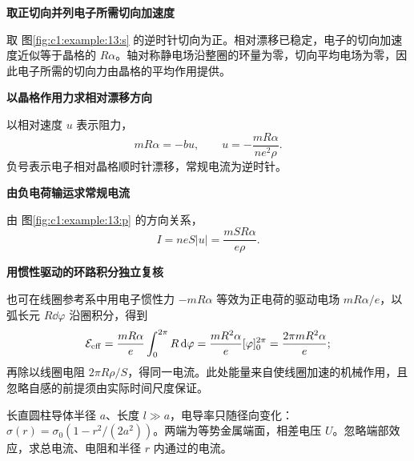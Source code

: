 \begin{solution}\textbf{取正切向并列电子所需切向加速度}\par\nobreak
取 图\ref{fig:c1:example:13:s} 的逆时针切向为正。相对漂移已稳定，电子的切向加速度近似等于晶格的 $R\alpha$。轴对称静电场沿整圈的环量为零，切向平均电场为零，因此电子所需的切向力由晶格的平均作用提供。

\par\medskip{}\noindent\textbf{以晶格作用力求相对漂移方向}\par\nobreak
以相对速度 $u$ 表示阻力，
\[
 mR\alpha=-bu,\qquad u=-\frac{mR\alpha}{ne^2\rho}.
\]
负号表示电子相对晶格顺时针漂移，常规电流为逆时针。



\par\medskip{}\noindent\textbf{由负电荷输运求常规电流}\par\nobreak
由 图\ref{fig:c1:example:13:p} 的方向关系，
\[
 I=neS|u|=\frac{mSR\alpha}{e\rho}.
\]


\par\medskip{}\noindent\textbf{用惯性驱动的环路积分独立复核}\par\nobreak
也可在线圈参考系中用电子惯性力 $-mR\alpha$ 等效为正电荷的驱动电场 $mR\alpha/e$，以弧长元 $R\dd\varphi$ 沿圈积分，得到
\[
 \mathcal E_{\rm eff}=\frac{mR\alpha}{e}\int_0^{2\pi}R\mathop{}\!\mathrm d\varphi
 =\frac{mR^2\alpha}{e}[\varphi]_0^{2\pi}
 =\frac{2\pi mR^2\alpha}{e};
\]再除以线圈电阻 $2\pi R\rho/S$，得同一电流。此处能量来自使线圈加速的机械作用，且忽略自感的前提须由实际时间尺度保证。\end{solution}
\begin{question}\begin{example}[径向不均匀材料的轴向导电]\label{c1:example:14}
长直圆柱导体半径 $a$、长度 $l\gg a$，电导率只随径向变化：$\sigma(r)=\sigma_0(1-r^2/(2a^2))$。两端为等势金属端面，相差电压 $U$。忽略端部效应，求总电流、电阻和半径 $r$ 内通过的电流。
\end{example}
\end{question}
